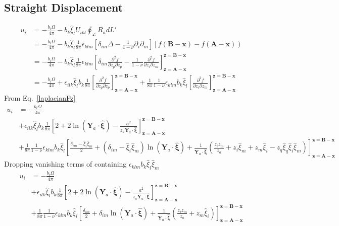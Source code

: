 \subsection{Straight Displacement}
\begin{align}
 u_i
 &=-\frac{ b_i\Omega}{4\pi}-b_k\hat{\xi}_lU_{ikl}\oint_\mathcal{L}R_adL'\nonumber\\
 &=-\frac{ b_i\Omega}{4\pi}-b_k\hat{\xi}_l\frac{1}{8\pi}\epsilon_{klm}\left[ \delta_{im}\Delta  -\frac{1}{1-\nu} \partial_i\partial_m  \right]\left[f(\bm B-\bm x)-f(\bm A-\bm x)\right)\nonumber\\
 &=-\frac{ b_i\Omega}{4\pi}-b_k\hat{\xi}_l\frac{1}{8\pi}\epsilon_{klm}\left[ \delta_{im}\frac{\partial^2f}{\partial z_p\partial z_p}  -\frac{1}{1-\nu} \frac{\partial^2 f}{\partial z_i\partial z_m}  \right]^{\bm z=\bm B-\bm x}_{\bm z=\bm A-\bm x}\nonumber\\
 &=-\frac{ b_i\Omega}{4\pi}+\epsilon_{ilk}\hat{\xi}_lb_k\frac{1}{8\pi}\left[ \frac{\partial^2f}{\partial z_p\partial z_p}\right]^{\bm z=\bm B-\bm x}_{\bm z=\bm A-\bm x}  +\frac{1}{8\pi}\frac{1}{1-\nu} \epsilon_{klm}b_k\hat{\xi}_l\left[\frac{\partial^2 f}{\partial z_i\partial z_m}  \right]^{\bm z=\bm B-\bm x}_{\bm z=\bm A-\bm x}
\end{align}
From Eq.~\eqref{laplacianFz}
\begin{align}
 u_i &=-\frac{ b_i\Omega}{4\pi}\nonumber\\
 &+\epsilon_{ilk}\hat{\xi}_lb_k\frac{1}{8\pi}\left[2+ 2\ln\left(\bm Y_a \cdot \hat{\bm \xi}\right)-\frac{a^2}{z_a \bm Y_a \cdot \hat{\bm \xi}}\right]^{\bm z=\bm B-\bm x}_{\bm z=\bm A-\bm x}  \nonumber\\
 &+\frac{1}{8\pi}\frac{1}{1-\nu} \epsilon_{klm}b_k\hat{\xi}_l\left[\frac{ \delta_{im}-\hat{\xi}_i\hat{\xi}_m}{2}
+ (\delta_{im}-\hat{\xi}_i\hat{\xi}_m)\ln\left(\bm Y_a \cdot \hat{\bm \xi}\right)
+ \frac{1}{ \bm Y_a \cdot \hat{\bm \xi}}\left(\frac{z_iz_m}{z_a}+z_i\hat{\xi}_m+z_m\hat{\xi}_i-z_q\hat{\xi}_q\hat{\xi}_i\hat{\xi}_m\right) \right]^{\bm z=\bm B-\bm x}_{\bm z=\bm A-\bm x}
\end{align}
Dropping vanishing terms of containing $\epsilon_{klm}b_k\hat{\xi}_l\hat{\xi}_m$
\begin{align}
 u_i &=-\frac{ b_i\Omega}{4\pi}\nonumber\\
 &+\epsilon_{ilk}\hat{\xi}_lb_k\frac{1}{8\pi}\left[2+ 2\ln\left(\bm Y_a \cdot \hat{\bm \xi}\right)-\frac{a^2}{z_a \bm Y_a \cdot \hat{\bm \xi}}\right]^{\bm z=\bm B-\bm x}_{\bm z=\bm A-\bm x}  \nonumber\\
 &+\frac{1}{8\pi}\frac{1}{1-\nu} \epsilon_{klm}b_k\hat{\xi}_l\left[\frac{ \delta_{im}}{2}
+ \delta_{im}\ln\left(\bm Y_a \cdot \hat{\bm \xi}\right)
+ \frac{1}{ \bm Y_a \cdot \hat{\bm \xi}}\left(\frac{z_iz_m}{z_a}+z_m\hat{\xi}_i\right) \right]^{\bm z=\bm B-\bm x}_{\bm z=\bm A-\bm x}
\end{align}
